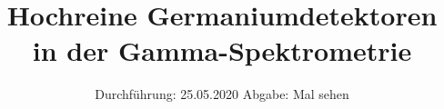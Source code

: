 

\subject{V 18}
\title{Hochreine Germaniumdetektoren in der Gamma-Spektrometrie}
\date{%
  Durchführung: 25.05.2020
  \hspace{3em}
  Abgabe: Mal sehen
}



\maketitle
\thispagestyle{empty}
\tableofcontents
\newpage






\printbibliography{}


